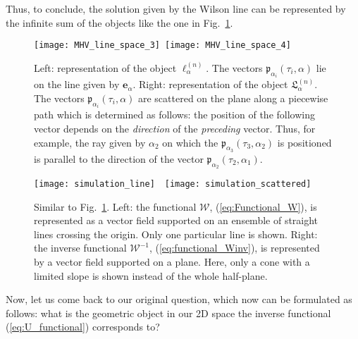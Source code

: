 \documentclass[english,american]{article}
\begin{document}
Thus, to conclude, the solution given by the Wilson line can be represented
by the infinite sum of the objects like the one in Fig.~\ref{fig:l_line}.

\begin{figure}
\begin{centering}
\texttt{[image: MHV\_line\_space\_3]}$\,\,\,$\texttt{[image: MHV\_line\_space\_4]}
\par\end{centering}

\caption{Left: representation of the object $\ell_{\alpha}^{\left(n\right)}$.
The vectors $\mathfrak{p}_{\alpha_{i}}\left(\tau_{i},\alpha\right)$
lie on the line given by $\mathbf{e}_{\alpha}$. Right: representation
of the object $\mathfrak{L}_{\alpha}^{\left(n\right)}$. The vectors
$\mathfrak{p}_{\alpha_{i}}\left(\tau_{i},\alpha\right)$ are scattered
on the plane along a piecewise path  which is determined as follows: the position of the 
following vector depends on the {\it direction} of the {\it preceding} vector. Thus, for example,
 the ray given by $\alpha_2$ on which the $\mathfrak{p}_{\alpha_3}(\tau_3,\alpha_2)$ is positioned 
 is parallel to the direction of the vector $\mathfrak{p}_{\alpha_2}(\tau_2,\alpha_1)$.
\label{fig:l_line}}
\end{figure}

\begin{figure}
\begin{centering}
\texttt{[image: simulation\_line]}$\,\,\,\,\,\,$\texttt{[image: simulation\_scattered]}
\par\end{centering}

\caption{Similar to Fig.~\ref{fig:l_line}. Left: the functional $\mathcal{W}$,
(\ref{eq:Functional_W}), is represented as a vector field supported
on an ensemble of straight lines crossing the origin. Only one particular
line is shown.  Right: the inverse functional $\mathcal{W}^{-1}$,
(\ref{eq:functional_Winv}), is represented by a vector field supported
on a plane.
Here, only a cone with a limited slope is shown instead of the whole
half-plane. \label{fig:simulations}}
\end{figure}


Now, let us come back to our original question, which now can be formulated
as follows: what is the geometric object in our 2D space the inverse
functional (\ref{eq:U_functional}) corresponds to? 
\end{document}
